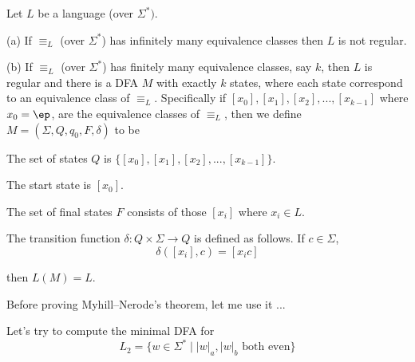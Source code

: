 \begin{thm} 
  Let $L$ be a language (over $\Sigma^*)$.
  \begin{tightlist}
  \item[\textnormal{(a)}] If $\equiv_L$ (over $\Sigma^*$) has infinitely many equivalence classes
    then $L$ is not regular.
  \item[\textnormal{(b)}] If $\equiv_L$ (over $\Sigma^*$) has finitely many equivalence classes, say $k$,
    then $L$ is regular and there is a DFA $M$ with exactly $k$ states, where each state
    correspond to an equivalence class of $\equiv_L$.
    Specifically if
    $
    [x_0],
    [x_1],
    [x_2],...,
    [x_{k-1}]
    $
    where $x_0 = \ep$,
    are the equivalence classes of $\equiv_L$, then we 
    define $M = (\Sigma, Q, q_0, F, \delta)$ to be
    \begin{tightlist}
    \item The set of states $Q$ is $\{[x_0], [x_1], [x_2],..., [x_{k-1}]\}$.
    \item The start state is $[x_0]$.
    \item The set of final states $F$ consists of those $[x_i]$ where $x_i \in L$.
    \item The transition function $\delta : Q \times \Sigma \rightarrow Q$ is defined as follows.
      If $c \in \Sigma$,
      \[
      \delta([x_i], c) = [x_i c]
      \]
    \end{tightlist}
    then $L(M) = L$.
  \end{tightlist}
\end{thm}


Before proving Myhill--Nerode's theorem, let me use it ...

\newpage
\begin{eg}
  Let's try to compute the minimal DFA for
  \[
  L_2 = \{w \in \Sigma^* \mid |w|_a, |w|_b \text{ both even}\}
  \]
\end{eg}

